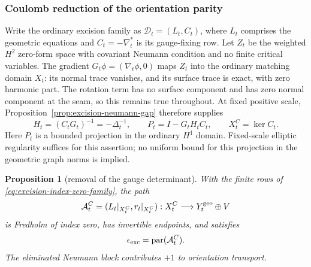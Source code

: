 \documentclass[11pt]{amsart}
\newtheorem{proposition}[theorem]{Proposition}
\theoremstyle{definition}
\theoremstyle{remark}
\theoremstyle{plain}
\begin{document}
\subsubsection{Coulomb reduction of the orientation parity}

Write the ordinary excision family as
$\mathcal D_t=(L_t,C_t)$, where $L_t$ comprises the geometric
equations and $C_t=-\nabla_t^*$ is its gauge-fixing row.
Let $Z_t$ be the weighted $H^2$ zero-form space with covariant
Neumann condition and no finite critical variables.
The gradient $G_t\phi=(\nabla_t\phi,0)$ maps $Z_t$ into the
ordinary matching domain $X_t$: its normal trace vanishes,
and its surface trace is exact, with zero harmonic part.
The rotation term has no surface component and has zero
normal component at the seam, so this remains true throughout.
At fixed positive scale, Proposition~\ref{prop:excision-neumann-gap}
therefore supplies
\begin{equation}\label{eq:excision-coulomb-projection}
 H_t=(C_tG_t)^{-1}=-\Delta_t^{-1},\qquad
 P_t=I-G_tH_tC_t,\qquad X_t^C=\ker C_t.
\end{equation}
Here $P_t$ is a bounded projection in the ordinary $H^1$ domain.
Fixed-scale elliptic regularity suffices for this assertion;
no uniform bound for this projection in the geometric graph
norms is implied.

\begin{proposition}[removal of the gauge determinant]
\label{prop:excision-coulomb-parity}
With the finite rows of \eqref{eq:excision-index-zero-family},
the path
\begin{equation}\label{eq:excision-coulomb-augmented-path}
 \mathcal A_t^C=
   (L_t|_{X_t^C},r_t|_{X_t^C}):
            X_t^C\longrightarrow Y_t^{\rm geo}\oplus V
\end{equation}
is Fredholm of index zero, has invertible endpoints, and satisfies
\begin{equation}\label{eq:excision-coulomb-parity}
                 \epsilon_{\rm exc}
                           =\operatorname{par}(\mathcal A_t^C).
\end{equation}
The eliminated Neumann block contributes $+1$ to orientation
transport.
\end{proposition}
\end{document}
